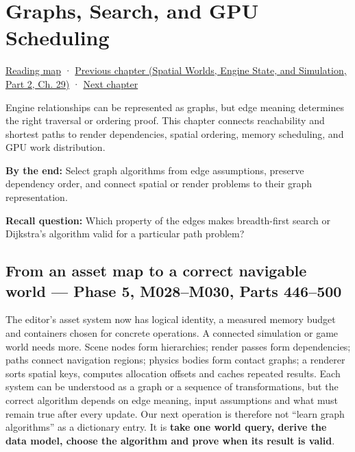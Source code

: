 \chapter{Graphs, Search, and GPU Scheduling}\label{01-foundations-i-ch008-graphs-search-and-gpu-scheduling}\hypertarget{01-foundations-i-ch008}{}\label{stagechapter:01-foundations-i-ch008}

\hypertarget{01-foundations-i-ch008-graphs-search-and-gpu-scheduling}{}

\hyperref[volume-reading-map]{Reading map} · \href{../05-Spatial-Worlds-Engine-State-and-Simulation-P02/main.pdf\#nameddest=06-engine-ii-ch040}{Previous chapter (Spatial Worlds, Engine State, and Simulation, Part 2, Ch. 29)} · \hyperref[01-foundations-i-ch009-gpu-memory-divergence-atomics-and-ordering]{Next chapter}

Engine relationships can be represented as graphs, but edge meaning determines the right traversal or ordering proof. This chapter connects reachability and shortest paths to render dependencies, spatial ordering, memory scheduling, and GPU work distribution.

\textbf{By the end:} Select graph algorithms from edge assumptions, preserve dependency order, and connect spatial or render problems to their graph representation.

\textbf{Recall question:} Which property of the edges makes breadth-first search or Dijkstra's algorithm valid for a particular path problem?

\section{From an asset map to a correct navigable world --- Phase 5, M028--M030, Parts 446--500}\label{01-foundations-i-ch008-from-an-asset-map-to-a-correct-navigable-world-phase-5-m028m030-parts-446500}

\hypertarget{01-foundations-i-ch008-from-an-asset-map-to-a-correct-navigable-world-phase-5-m028m030-parts-446500}{}

The editor's asset system now has logical identity, a measured memory budget and containers chosen for concrete operations. A connected simulation or game world needs more. Scene nodes form hierarchies; render passes form dependencies; paths connect navigation regions; physics bodies form contact graphs; a renderer sorts spatial keys, computes allocation offsets and caches repeated results. Each system can be understood as a graph or a sequence of transformations, but the correct algorithm depends on edge meaning, input assumptions and what must remain true after every update. Our next operation is therefore not ``learn graph algorithms'' as a dictionary entry. It is \textbf{take one world query, derive the data model, choose the algorithm and prove when its result is valid}.

